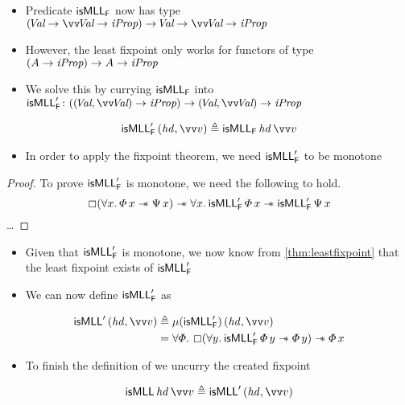 \documentclass[thesis.tex]{subfiles}
\begin{document}
\begin{example}
\begin{itemize}
        \item Predicate $\textsf{\upshape isMLL}_{\textsf{\upshape F}}$ now has type $(\Val \to \vect{\Val} \to \iProp) \to \Val \to \vect{\Val} \to \iProp$
        \item However, the least fixpoint only works for functors of type $(A \to \textit{iProp}) \to A \to \textit{iProp}$
        \item We solve this by currying $\textsf{\upshape isMLL}_{\textsf{\upshape F}}$ into $\isMLL'_\hopred\colon ((\Val, \vect{\Val}) \to \iProp) \to  (\Val, \vect{\Val}) \to \iProp$
    \end{itemize}
    \begin{align*}
        \isMLL'_\hopred\, (\langv{hd}, \vect{\val}) \eqdef \isMLL_\hopred\, \langv{hd}\, \vect{\val}
    \end{align*}
    \begin{itemize}
        \item In order to apply the fixpoint theorem, we need $\textsf{\upshape isMLL}'_{\textsf{\upshape F}}$ to be monotone
    \end{itemize}
    \begin{proof}
        To prove $\textsf{\upshape isMLL}'_{\textsf{\upshape F}}$ is monotone, we need the following to hold.
        \[ \always(\All\var. \pred\,\var \wand \predB\,\var) \wand \All\var. \isMLL'_\hopred\, \pred\, \var \wand \isMLL'_\hopred\, \predB\, \var \]
        \ldots
    \end{proof}
    \begin{itemize}
        \item Given that $\textsf{\upshape isMLL}'_{\textsf{\upshape F}}$ is monotone, we now know from \cref*{thm:leastfixpoint} that the least fixpoint exists of $\textsf{\upshape isMLL}'_{\textsf{\upshape F}}$
        \item We can now define $\textsf{\upshape isMLL}'_{\textsf{\upshape F}}$ as
    \end{itemize}
    \begin{align*}
        \isMLL'\, (\langv{hd}, \vect{\val}) & \eqdef \lfp(\isMLL'_\hopred)\, (\langv{hd}, \vect{\val})                                                   \\
                                            & = \All \pred. \always(\All \varB. \isMLL'_\hopred\, \pred\, \varB \wand \pred\, \varB) \wand \pred \, \var
    \end{align*}
    \begin{itemize}
        \item To finish the definition of \isMLL we uncurry the created fixpoint
    \end{itemize}
    \begin{align*}
        \isMLL\, \langv{hd}\, \vect{\val} \eqdef \isMLL'\, (\langv{hd}, \vect{\val})
    \end{align*}

\end{example}
\end{document}
